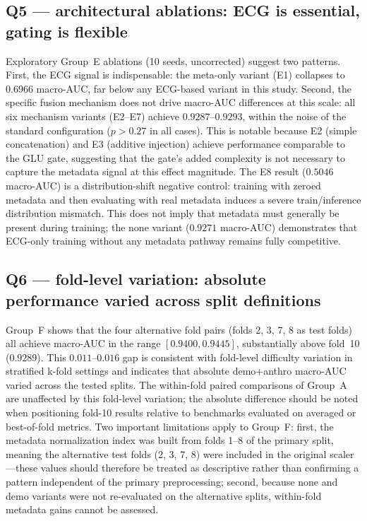 \documentclass[mathematics,article,submit,pdftex]{Definitions/mdpi}
\def\texttt#1{#1}%
\begin{document}
\subsection{Q5 --- architectural ablations: ECG is essential, gating is flexible}
Exploratory Group~E ablations (10 seeds, uncorrected) suggest two patterns. First, the ECG signal is indispensable: the meta-only variant (E1) collapses to $0.6966$ macro-AUC, far below any ECG-based variant in this study. Second, the specific fusion mechanism does not drive macro-AUC differences at this scale: all six mechanism variants (E2--E7) achieve $0.9287$--$0.9293$, within the noise of the standard configuration ($p{>}0.27$ in all cases). This is notable because E2 (simple concatenation) and E3 (additive injection) achieve performance comparable to the GLU gate, suggesting that the gate's added complexity is not necessary to capture the metadata signal at this effect magnitude. The E8 result ($0.5046$ macro-AUC) is a distribution-shift negative control: training with zeroed metadata and then evaluating with real metadata induces a severe train/inference distribution mismatch. This does not imply that metadata must generally be present during training; the \texttt{none} variant ($0.9271$ macro-AUC) demonstrates that ECG-only training without any metadata pathway remains fully competitive.

\subsection{Q6 --- fold-level variation: absolute performance varied across split definitions}
Group~F shows that the four alternative fold pairs (folds 2, 3, 7, 8 as test folds) all achieve macro-AUC in the range $[0.9400, 0.9445]$, substantially above fold~10 ($0.9289$). This $0.011$--$0.016$ gap is consistent with fold-level difficulty variation in stratified k-fold settings and indicates that absolute \texttt{demo+anthro} macro-AUC varied across the tested splits. The within-fold paired comparisons of Group~A are unaffected by this fold-level variation; the absolute difference should be noted when positioning fold-10 results relative to benchmarks evaluated on averaged or best-of-fold metrics. Two important limitations apply to Group~F: first, the metadata normalization index was built from folds 1--8 of the primary split, meaning the alternative test folds (2, 3, 7, 8) were included in the original scaler---these values should therefore be treated as descriptive rather than confirming a pattern independent of the primary preprocessing; second, because \texttt{none} and \texttt{demo} variants were not re-evaluated on the alternative splits, within-fold metadata gains cannot be assessed.
\end{document}
